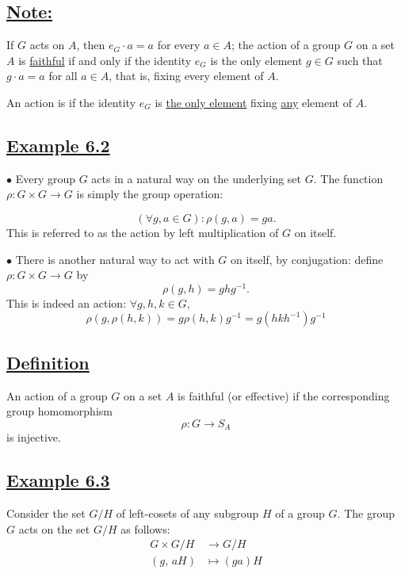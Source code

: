 \vspace{1em}

\subsection*{\underline{Note:}}
If $G$ acts on $A$, then $e_G \cdot a = a$ for every $a \in A$; the action of a group $G$ on a set $A$ is \underline{faithful} if and only if the identity $e_G$ is the only element $g \in G$ such that $g \cdot a = a$ for all $a \in A$, that is, fixing every element of $A$.

An action is \underline{\smash{\textcolor{blue}{free}}} if the identity $e_G$ is \underline{the only element} fixing \underline{any} element of $A$.

\vspace{1em}


\subsection*{\underline{Example 6.2}}
{\color{blue}$\bullet$} Every group $G$ acts in a natural way on the underlying set $G$. The function $\rho : G \times G \longrightarrow G$ is simply the group operation:

\[
(\forall g, a \in G) : \rho(g, a) = ga.
\]
This is referred to as the action by left multiplication of $G$ on itself.

{\color{blue}$\bullet$} There is another natural way to act with $G$ on itself, by conjugation: define $\rho : G \times G \longrightarrow G$ by
\[
\rho(g, h) = ghg^{-1}.
\]
This is indeed an action: $\forall g, h, k \in G$,
\[
\rho(g, \rho(h, k)) = g\rho(h, k)g^{-1} = g(hkh^{-1})g^{-1}
\]

\vspace{5em}

\subsection*{\underline{Definition}}
An action of a group $G$ on a set $A$ is faithful (or effective) if the corresponding group homomorphism
\[
\rho : G \longrightarrow S_A
\]
is injective.


\subsection*{\underline{Example 6.3}}
Consider the set $G/H$ of left-cosets of any subgroup $H$ of a group $G$. The group $G$ acts on the set $G/H$ as follows:
\begin{align*}
G \times G/H &\longrightarrow G/H \\
(g, \, aH) &\longmapsto (ga)H
\end{align*}

